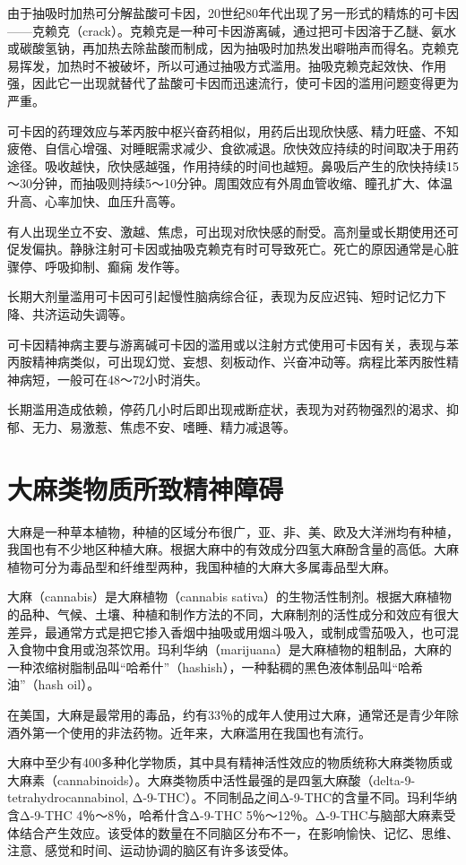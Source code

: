 由于抽吸时加热可分解盐酸可卡因，20世纪80年代出现了另一形式的精炼的可卡因------克赖克（crack）。克赖克是一种可卡因游离碱，通过把可卡因溶于乙醚、氨水或碳酸氢钠，再加热去除盐酸而制成，因为抽吸时加热发出噼啪声而得名。克赖克易挥发，加热时不被破坏，所以可通过抽吸方式滥用。抽吸克赖克起效快、作用强，因此它一出现就替代了盐酸可卡因而迅速流行，使可卡因的滥用问题变得更为严重。

可卡因的药理效应与苯丙胺中枢兴奋药相似，用药后出现欣快感、精力旺盛、不知疲倦、自信心增强、对睡眠需求减少、食欲减退。欣快效应持续的时间取决于用药途径。吸收越快，欣快感越强，作用持续的时间也越短。鼻吸后产生的欣快持续15～30分钟，而抽吸则持续5～10分钟。周围效应有外周血管收缩、瞳孔扩大、体温升高、心率加快、血压升高等。

有人出现坐立不安、激越、焦虑，可出现对欣快感的耐受。高剂量或长期使用还可促发偏执。静脉注射可卡因或抽吸克赖克有时可导致死亡。死亡的原因通常是心脏骤停、呼吸抑制、癫痫
发作等。

长期大剂量滥用可卡因可引起慢性脑病综合征，表现为反应迟钝、短时记忆力下降、共济运动失调等。

可卡因精神病主要与游离碱可卡因的滥用或以注射方式使用可卡因有关，表现与苯丙胺精神病类似，可出现幻觉、妄想、刻板动作、兴奋冲动等。病程比苯丙胺性精神病短，一般可在48～72小时消失。

长期滥用造成依赖，停药几小时后即出现戒断症状，表现为对药物强烈的渴求、抑郁、无力、易激惹、焦虑不安、嗜睡、精力减退等。

\section{大麻类物质所致精神障碍}

大麻是一种草本植物，种植的区域分布很广，亚、非、美、欧及大洋洲均有种植，我国也有不少地区种植大麻。根据大麻中的有效成分四氢大麻酚含量的高低。大麻植物可分为毒品型和纤维型两种，我国种植的大麻大多属毒品型大麻。

大麻（cannabis）是大麻植物（cannabis
sativa）的生物活性制剂。根据大麻植物的品种、气候、土壤、种植和制作方法的不同，大麻制剂的活性成分和效应有很大差异，最通常方式是把它掺入香烟中抽吸或用烟斗吸入，或制成雪茄吸入，也可混入食物中食用或泡茶饮用。玛利华纳（marijuana）是大麻植物的粗制品，大麻的一种浓缩树脂制品叫``哈希什''（hashish），一种黏稠的黑色液体制品叫``哈希油''（hash
oil）。

在美国，大麻是最常用的毒品，约有33％的成年人使用过大麻，通常还是青少年除酒外第一个使用的非法药物。近年来，大麻滥用在我国也有流行。

大麻中至少有400多种化学物质，其中具有精神活性效应的物质统称大麻类物质或大麻素（cannabinoids）。大麻类物质中活性最强的是四氢大麻酸（delta-9-tetrahydrocannabinol,
Δ-9-THC）。不同制品之间Δ-9-THC的含量不同。玛利华纳含Δ-9-THC
4％～8％，哈希什含Δ-9-THC
5％～12％。Δ-9-THC与脑部大麻素受体结合产生效应。该受体的数量在不同脑区分布不一，在影响愉快、记忆、思维、注意、感觉和时间、运动协调的脑区有许多该受体。

